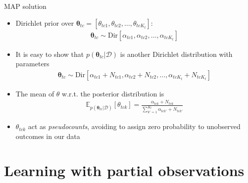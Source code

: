\documentclass[10pt]{beamer}
\newcommand{\ve}[1]{\boldsymbol{#1}}
\begin{document}
\begin{frame}{MAP solution}
\begin{itemize}
\item Dirichlet prior over $\ve{\theta}_{tc}=[\theta_{tc1}, \theta_{tc2}, \ldots, \theta_{tcK_t}]$:
\begin{align*}
\ve{\theta}_{tc} \sim \text{Dir}\left[\alpha_{tc1}, \alpha_{tc2}, \ldots, \alpha_{tcK_t}\right]
\end{align*}
\item It is easy to show that $p(\ve{\theta}_{tc}|\mathcal{D})$ is another Dirichlet distribution with parameters
\begin{align*}
\ve{\theta}_{tc} \sim \text{Dir}\left[\alpha_{tc1}+N_{tc1}, \alpha_{tc2}+N_{tc2}, \ldots, \alpha_{tcK_t}+N_{tcK_t}\right]
\end{align*}
\item The mean of $\theta$ w.r.t. the posterior distribution is
\begin{align*}
\mathbb{E}_{p(\ve{\theta}_{tc}|\mathcal{D})}[\theta_{tck}]=\frac{\alpha_{tck}+N_{tck}}{\sum_{k'=1}^{K_t} \alpha_{tck'}+N_{tck'}}
\end{align*}
\item $\theta_{tck}$ act as \emph{pseudocounts}, avoiding to assign zero probability to unobserved outcomes in our data
\end{itemize}


\end{frame}

\section{Learning with partial observations}
\end{document}
